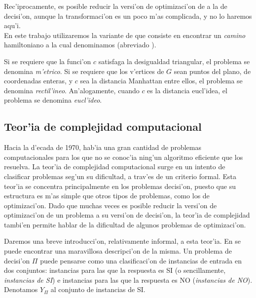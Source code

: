 Rec'iprocamente, es posible reducir la versi'on de optimizaci'on de  a la de decisi'on, aunque la transformaci'on es un poco m'as complicada, y no lo haremos aqu'i.\\

En este trabajo utilizaremos la variante de  que consiste en encontrar un \emph{camino} hamiltoniano a la cual denominamos  (abreviado ).



\noindent
Si se requiere que la funci'on $c$ satisfaga la desigualdad triangular, el problema se denomina  \textit{m'etrico}. Si se requiere que los v'ertices de $G$ sean puntos del plano, de coordenadas enteras, y $c$ sea la distancia Manhattan entre ellos, el problema se denomina  \textit{rectil'ineo}. An'alogamente, cuando $c$ es la distancia eucl'idea, el problema se denomina  \textit{eucl'ideo}.

\subsection{Teor'ia de complejidad computacional}

Hacia la d'ecada de 1970, hab'ia una gran cantidad de problemas computacionales para los que no se conoc'ia ning'un algoritmo eficiente que los resuelva. La teor'ia de complejidad computacional surge en un intento de clasificar problemas seg'un su dificultad, a trav'es de un criterio formal. Esta teor'ia se concentra principalmente en los problemas decisi'on, puesto que su estructura es m'as simple que otros tipos de problemas, como los de optimizaci'on. Dado que muchas veces es posible reducir la versi'on de optimizaci'on de un problema a su versi'on de decisi'on, la teor'ia de complejidad tambi'en permite hablar de la dificultad de algunos problemas de optimizaci'on.

Daremos una breve introducci'on, relativamente informal, a esta teor'ia. En \cite{Ga79} se puede encontrar una maravillosa descripci'on de la misma. Un problema de decisi'on $\Pi$ puede pensarse como una clasificaci'on de instancias de entrada en dos conjuntos: instancias para las que la respuesta es SI (o sencillamente, \textit{instancias de SI}) e instancias para las que la respuesta es NO (\textit{instancias de NO}). Denotamos $Y_{\Pi}$ al conjunto de instancias de SI.

